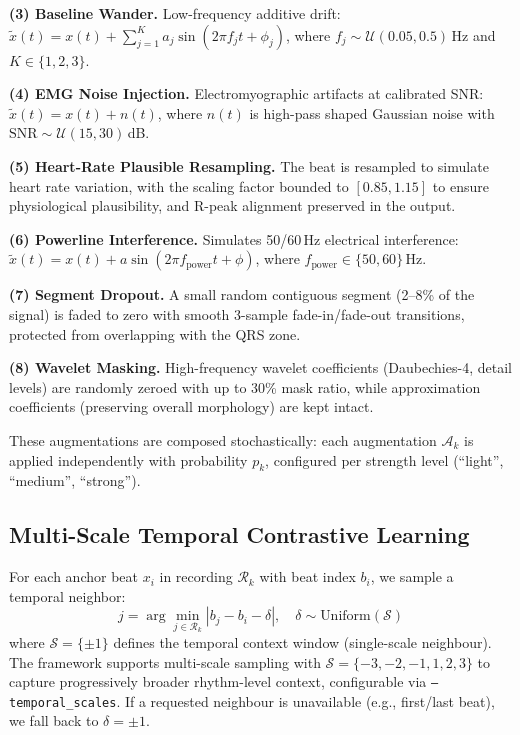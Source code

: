 \documentclass[journal,10pt]{IEEEtran}
\begin{document}
\vspace{0.3em}
\noindent\textbf{(3) Baseline Wander.} Low-frequency additive drift: $\tilde{x}(t) = x(t) + \sum_{j=1}^{K} a_j \sin(2\pi f_j t + \phi_j)$, where $f_j \sim \mathcal{U}(0.05, 0.5)$\,Hz and $K \in \{1, 2, 3\}$.

\vspace{0.3em}
\noindent\textbf{(4) EMG Noise Injection.} Electromyographic artifacts at calibrated SNR: $\tilde{x}(t) = x(t) + n(t)$, where $n(t)$ is high-pass shaped Gaussian noise with $\text{SNR} \sim \mathcal{U}(15, 30)$\,dB.

\vspace{0.3em}
\noindent\textbf{(5) Heart-Rate Plausible Resampling.} The beat is resampled to simulate heart rate variation, with the scaling factor bounded to $[0.85, 1.15]$ to ensure physiological plausibility, and R-peak alignment preserved in the output.

\vspace{0.3em}
\noindent\textbf{(6) Powerline Interference.} Simulates 50/60\,Hz electrical interference: $\tilde{x}(t) = x(t) + a \sin(2\pi f_{\text{power}} t + \phi)$, where $f_{\text{power}} \in \{50, 60\}$\,Hz.

\vspace{0.3em}
\noindent\textbf{(7) Segment Dropout.} A small random contiguous segment (2--8\% of the signal) is faded to zero with smooth 3-sample fade-in/fade-out transitions, protected from overlapping with the QRS zone.

\vspace{0.3em}
\noindent\textbf{(8) Wavelet Masking.} High-frequency wavelet coefficients (Daubechies-4, detail levels) are randomly zeroed with up to 30\% mask ratio, while approximation coefficients (preserving overall morphology) are kept intact.

\vspace{0.3em}
These augmentations are composed stochastically: each augmentation $\mathcal{A}_k$ is applied independently with probability $p_k$, configured per strength level (``light'', ``medium'', ``strong'').

\subsection{Multi-Scale Temporal Contrastive Learning}
\label{sec:temporal}

For each anchor beat $x_i$ in recording $\mathcal{R}_k$ with beat index $b_i$, we sample a temporal neighbor:
\begin{equation}
    j = \arg\min_{j \in \mathcal{R}_k} |b_j - b_i - \delta|, \quad \delta \sim \text{Uniform}(\mathcal{S})
\end{equation}
where $\mathcal{S} = \{\pm 1\}$ defines the temporal context window (single-scale neighbour). The framework supports multi-scale sampling with $\mathcal{S} = \{-3,-2,-1,1,2,3\}$ to capture progressively broader rhythm-level context, configurable via \texttt{--temporal\_scales}. If a requested neighbour is unavailable (e.g., first/last beat), we fall back to $\delta = \pm 1$.
\end{document}
